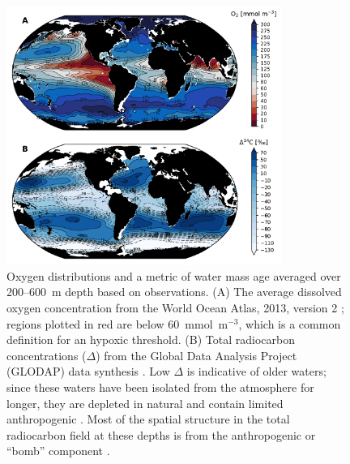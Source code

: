 \documentclass[draft,linenumbers]{report_chapter}
\begin{document}
\begin{figure}[t!]
\centering
\includegraphics[width=0.8\textwidth]{woa-thermocline-o2-w-age_metric.pdf}
\caption{Oxygen distributions and a metric of water mass age averaged over 200--600~m depth based on observations.
(A) The average dissolved oxygen concentration from the World Ocean Atlas, 2013, version 2 \citep{Garcia-Locarnini-etal-2014}; regions plotted in red are below 60~mmol~m$^{-3}$, which is a common definition for an hypoxic threshold.
(B) Total radiocarbon concentrations ($\Delta$) from the Global Data Analysis Project (GLODAP) data synthesis \protect\citep{Key-Kozyr-etal-2004}.
Low $\Delta$ is indicative of older waters; since these waters have been isolated from the atmosphere for longer, they are depleted in natural  and contain limited anthropogenic .
Most of the spatial structure in the total radiocarbon field at these depths is from the anthropogenic or ``bomb'' component \citep{Key-Kozyr-etal-2004}.}
\label{fig:woa-thermocline-o2-age}
\end{figure}
\end{document}
